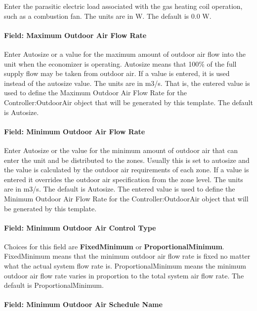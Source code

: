 Enter the parasitic electric load associated with the gas heating coil operation, such as a combustion fan. The units are in W. The default is 0.0 W.

\paragraph{Field: Maximum Outdoor Air Flow Rate}\label{field-maximum-outdoor-air-flow-rate-4}

Enter Autosize or a value for the maximum amount of outdoor air flow into the unit when the economizer is operating. Autosize means that 100\% of the full supply flow may be taken from outdoor air. If a value is entered, it is used instead of the autosize value. The units are in m3/s. That is, the entered value is used to define the Maximum Outdoor Air Flow Rate for the Controller:OutdoorAir object that will be generated by this template. The default is Autosize.

\paragraph{Field: Minimum Outdoor Air Flow Rate}\label{field-minimum-outdoor-air-flow-rate-4}

Enter Autosize or the value for the minimum amount of outdoor air that can enter the unit and be distributed to the zones. Usually this is set to autosize and the value is calculated by the outdoor air requirements of each zone. If a value is entered it overrides the outdoor air specification from the zone level. The units are in m3/s. The default is Autosize. The entered value is used to define the Minimum Outdoor Air Flow Rate for the Controller:OutdoorAir object that will be generated by this template.

\paragraph{Field: Minimum Outdoor Air Control Type}\label{field-minimum-outdoor-air-control-type-1}

Choices for this field are \textbf{FixedMinimum} or \textbf{ProportionalMinimum}. FixedMinimum means that the minimum outdoor air flow rate is fixed no matter what the actual system flow rate is. ProportionalMinimum means the minimum outdoor air flow rate varies in proportion to the total system air flow rate. The default is ProportionalMinimum.

\paragraph{Field: Minimum Outdoor Air Schedule Name}\label{field-minimum-outdoor-air-schedule-name-3}


